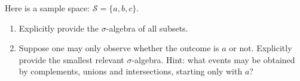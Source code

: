 \documentclass[12pt]{article}
\newenvironment{problem}[2][Problem]{\begin{trivlist}
\item[\hskip \labelsep {\bfseries #1}\hskip \labelsep {\bfseries #2.}]}
{\end{trivlist}}
\begin{document}
\begin{problem}{2}
  Here is a sample space: $\mathcal{S} = \{a, b, c\}$.
  \begin{enumerate}
    \item Explicitly provide the $\sigma$-algebra of all subsets.
    \item Suppose one may only observe whether the outcome is $a$ or not.
    Explicitly provide the smallest relevant $\sigma$-algebra. Hint: what
    events may be obtained by complements, unions and intersections,
    starting only with ${a}$?
  \end{enumerate}
\end{problem}

\end{document}
